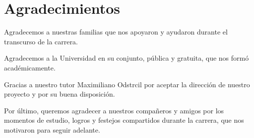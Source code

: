 
\chapter*{Agradecimientos}


Agradecemos a nuestras familias que nos apoyaron y ayudaron durante el transcurso de la carrera.

Agradecemos a la Universidad en su conjunto, pública y gratuita, que nos formó académicamente.

Gracias a nuestro tutor Maximiliano Odstrcil por aceptar la dirección de nuestro proyecto y por su buena disposición.

Por último, queremos agradecer a nuestros compañeros y amigos por los momentos de estudio, logros y festejos compartidos durante la carrera, que nos motivaron para seguir adelante.

\label{chap:agradecimientos}




